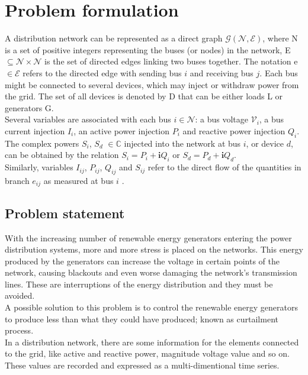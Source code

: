 \chapter{Problem formulation}

A distribution network can be represented as a direct graph $\mathcal{G}(\mathcal{N},\mathcal{E})$, where \gls{N} is a set of positive integers representing the buses (or nodes) in the network, \gls{E} $\subseteq \mathcal{N} \times \mathcal{N}$ is the set of directed edges linking two buses together. The notation \gls{e} $\in \mathcal{E}$ refers to the directed edge with sending bus $i$ and receiving bus $j$. Each bus might be connected to several devices, which may inject or withdraw power from the grid. The set of all devices is denoted by \gls{D} that can be either loads \gls{L} or generators \gls{G}. \\
Several variables are associated with each bus $i \in \mathcal{N}$: a bus voltage $\mathcal{V}_i$, a bus current injection $I_i$, an active power injection $P_i$ and reactive power injection $Q_i$. The complex powers $S_i$, $S_d$ $\in \mathbb{C}$ injected into the network at bus $i$, or device $d$, can be obtained by the relation $S_i = P_i + \mathbf{i}Q_i$ or $S_d = P_d + \mathbf{i}Q_d$. \\
Similarly, variables $I_{ij}$, $P_{ij}$, $Q_{ij}$ and $S_{ij}$ refer to the direct flow of the quantities in branch $e_{ij}$ as measured at bus $i$ \cite{gym-anm}.

\section{Problem statement}
\label{sec:ProbStat}
With the increasing number of renewable energy generators entering the power distribution systems, more and more stress is placed on the networks. This energy produced by the generators can increase the voltage in certain points of the network, causing blackouts and even worse damaging the network's transmission lines. These are interruptions of the energy distribution and they must be avoided. \\

A possible solution to this problem is to control the renewable energy generators to produce less than what they could have produced; known as curtailment process. \\
In a distribution network, there are some information for the elements connected to the grid, like active and reactive power, magnitude voltage value and so on. These values are recorded and expressed as a multi-dimentional time series.\\

